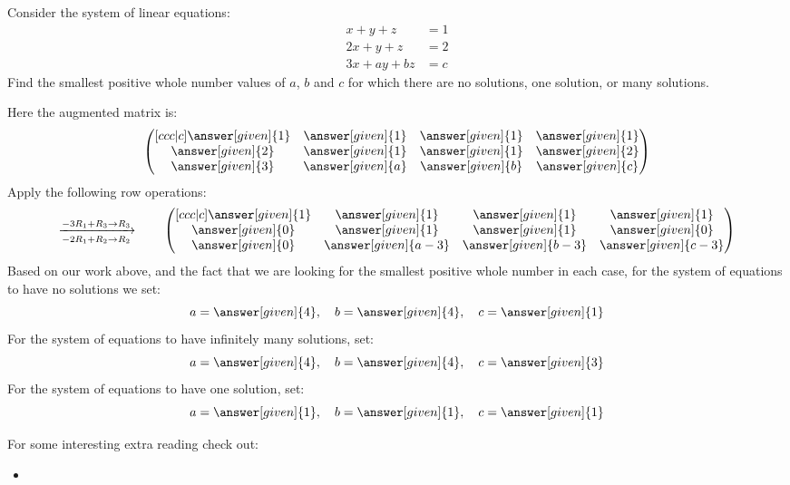 \documentclass{ximera}
\begin{document}
\begin{example}
  Consider the system of linear equations:
  \begin{align*}
    x+y+z &=  1\\
    2x+y+z &=  2\\
    3x+ay+bz &= c
  \end{align*}
  Find the smallest positive whole number values of $a$, $b$ and $c$
  for which there are no solutions, one solution, or many solutions.
  \begin{explanation}
    Here the augmented matrix is:
    \[
      \begin{pmatrix}[ccc|c]
        \answer[given]{1} &  \answer[given]{1} &  \answer[given]{1} &  \answer[given]{1} \\
        \answer[given]{2} &  \answer[given]{1} &  \answer[given]{1} &  \answer[given]{2} \\
        \answer[given]{3} &  \answer[given]{a} &  \answer[given]{b} &  \answer[given]{c}
      \end{pmatrix}
    \]
    Apply the following row operations:
    \[
      \xrightarrow[-2R_{1} + R_{2}\rightarrow R_{2}]{-3R_{1}+R_{3}\rightarrow R_{3}}\qquad
      \begin{pmatrix}[ccc|c]
        \answer[given]{1} &  \answer[given]{1} &  \answer[given]{1} &  \answer[given]{1} \\
        \answer[given]{0} &  \answer[given]{1} &  \answer[given]{1} &  \answer[given]{0} \\
        \answer[given]{0} &  \answer[given]{a-3} &  \answer[given]{b-3} &  \answer[given]{c-3}
      \end{pmatrix}
    \]
    Based on our work above, and the fact that we are looking for the
    smallest positive whole number in each case, for the system of
    equations to have no solutions we set:
    \[
    a = \answer[given]{4}, \quad b = \answer[given]{4}, \quad c = \answer[given]{1}
    \]
    For the system of equations to have infinitely many solutions,
    set:
    \[
    a = \answer[given]{4}, \quad b = \answer[given]{4}, \quad c = \answer[given]{3}
    \]
    For the system of equations to have one solution, set:
    \[
    a = \answer[given]{1}, \quad b = \answer[given]{1}, \quad c = \answer[given]{1}
    \]
  \end{explanation}
\end{example}


For some interesting extra reading check out:
\begin{itemize}
\item {}
\end{itemize}
\end{document}
